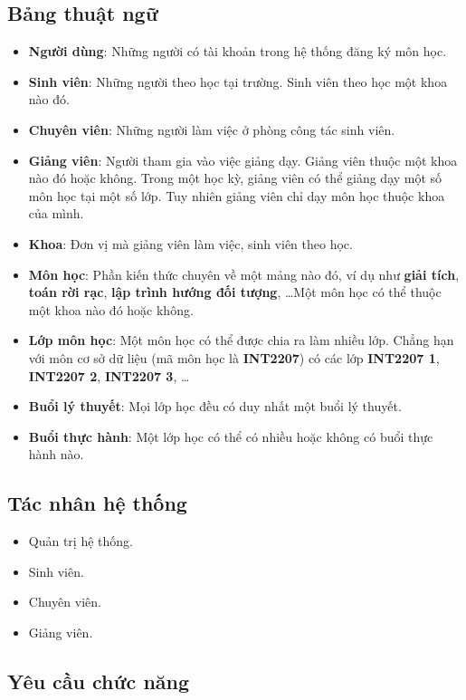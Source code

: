 \documentclass{article}
\begin{document}
  \subsection{Bảng thuật ngữ}
    \begin{itemize}
      \item \textbf{Người dùng}: Những người có tài khoản trong hệ thống đăng ký môn học.
      \item \textbf{Sinh viên}: Những người theo học tại trường. Sinh viên theo học một khoa nào đó.
      \item \textbf{Chuyên viên}: Những người làm việc ở phòng công tác sinh viên.
      \item \textbf{Giảng viên}: Người tham gia vào việc giảng dạy. Giảng viên thuộc một khoa nào đó hoặc không. Trong một học kỳ, giảng viên có thể giảng dạy một số môn học tại một số lớp. Tuy nhiên giảng viên chỉ dạy môn học thuộc khoa của mình.
      \item \textbf{Khoa}: Đơn vị mà giảng viên làm việc, sinh viên theo học.
      \item \textbf{Môn học}: Phần kiến thức chuyên về một mảng nào đó, ví dụ như \textbf{giải tích}, \textbf{toán rời rạc}, \textbf{lập trình hướng đối tượng}, \ldots Một môn học có thể thuộc một khoa nào đó hoặc không.
      \item \textbf{Lớp môn học}: Một môn học có thể được chia ra làm nhiều lớp. Chẳng hạn với môn cơ sở dữ liệu (mã môn học là \textbf{INT2207}) có các lớp \textbf{INT2207 1}, \textbf{INT2207 2}, \textbf{INT2207 3}, \ldots
      \item \textbf{Buổi lý thuyết}: Mọi lớp học đều có duy nhất một buổi lý thuyết.
      \item \textbf{Buổi thực hành}: Một lớp học có thể có nhiều hoặc không có buổi thực hành nào.
    \end{itemize}
  
  \subsection{Tác nhân hệ thống}
    \begin{itemize}
      \item Quản trị hệ thống.
      \item Sinh viên.
      \item Chuyên viên.
      \item Giảng viên.
    \end{itemize}
  
  \subsection{Yêu cầu chức năng}
\end{document}
